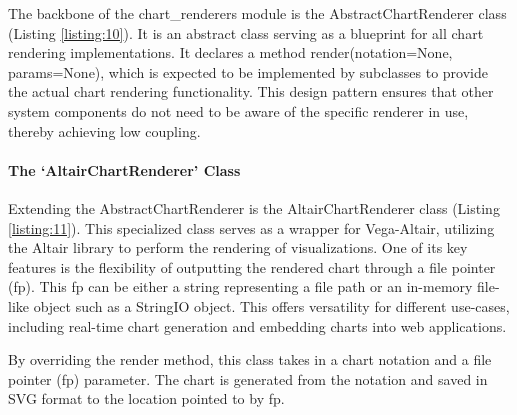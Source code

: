 The backbone of the chart\_renderers module is the AbstractChartRenderer
class (Listing \ref{listing:10}). It is an abstract class serving as a blueprint for
all chart rendering implementations. It declares a method
render(notation=None, params=None), which is expected to be implemented
by subclasses to provide the actual chart rendering functionality. This
design pattern ensures that other system components do not need to be
aware of the specific renderer in use, thereby achieving low coupling.


\paragraph{The `AltairChartRenderer'
Class}\label{the-altairchartrenderer-class}

Extending the AbstractChartRenderer is the AltairChartRenderer class
(Listing \ref{listing:11}). This specialized class serves as a wrapper for Vega-Altair,
utilizing the Altair library to perform the rendering of visualizations.
One of its key features is the flexibility of outputting the rendered
chart through a file pointer (fp). This fp can be either a string
representing a file path or an in-memory file-like object such as a
StringIO object. This offers versatility for different use-cases,
including real-time chart generation and embedding charts into web
applications.

By overriding the render method, this class takes in a chart notation
and a file pointer (fp) parameter. The chart is generated from the
notation and saved in SVG format to the location pointed to by fp.



